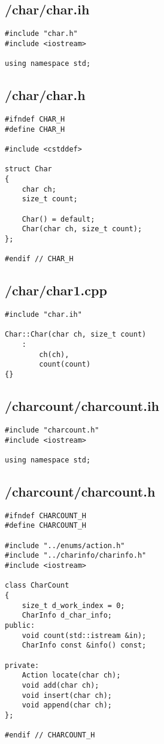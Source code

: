 \documentclass{article}
\begin{document}
\subsection*{/char/char.ih}
\begin{verbatim}
#include "char.h"
#include <iostream>

using namespace std;

\end{verbatim}
\subsection*{/char/char.h}
\begin{verbatim}
#ifndef CHAR_H
#define CHAR_H

#include <cstddef>

struct Char 
{
    char ch;
    size_t count;

    Char() = default;
    Char(char ch, size_t count);
};

#endif // CHAR_H

\end{verbatim}
\subsection*{/char/char1.cpp}
\begin{verbatim}
#include "char.ih"

Char::Char(char ch, size_t count)
    :
        ch(ch),
        count(count)
{}
\end{verbatim}

\subsection*{/charcount/charcount.ih}
\begin{verbatim}
#include "charcount.h"
#include <iostream>

using namespace std;

\end{verbatim}
\subsection*{/charcount/charcount.h}
\begin{verbatim}
#ifndef CHARCOUNT_H
#define CHARCOUNT_H

#include "../enums/action.h"
#include "../charinfo/charinfo.h"
#include <iostream>

class CharCount 
{
    size_t d_work_index = 0;
    CharInfo d_char_info;
public:
    void count(std::istream &in);
    CharInfo const &info() const;

private:
    Action locate(char ch);
    void add(char ch);
    void insert(char ch);
    void append(char ch);
};

#endif // CHARCOUNT_H

\end{verbatim}
\end{document}
